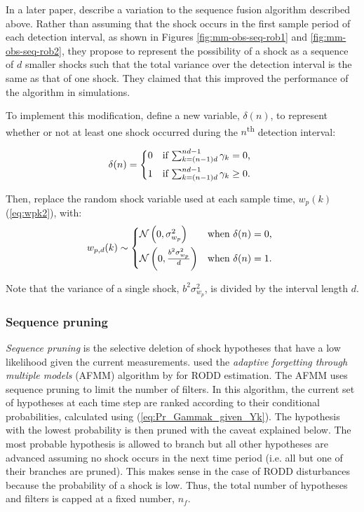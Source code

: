 In a later paper, \cite{robertson_method_1998} describe a variation to the sequence fusion algorithm described above.  Rather than assuming that the shock occurs in the first sample period of each detection interval, as shown in Figures \ref{fig:mm-obs-seq-rob1} and \ref{fig:mm-obs-seq-rob2}, they propose to represent the possibility of a shock as a sequence of $d$ smaller shocks such that the total variance over the detection interval is the same as that of one shock. They claimed that this improved the performance of the algorithm in simulations.

To implement this modification, define a new variable, $\delta(n)$, to represent whether or not at least one shock occurred during the $n$\textsuperscript{th} detection interval:

\begin{equation} \label{eq:deltak}
	\delta(n) = \begin{cases*}
		0 & \text{if} $\sum_{k=(n-1) d}^{n d-1} \gamma_{k}=0$, \\
		1 & \text{if} $\sum_{k=(n-1) d}^{n d-1} \gamma_{k}\ge0$.
	\end{cases*}
\end{equation}

Then, replace the random shock variable used at each sample time, $w_p(k)$ (\ref{eq:wpk2}), with:
\begin{equation} \label{eq:wpdk}
	w_{p,d}(k) \sim 
	\begin{cases*}
		\mathcal{N}\left(0, \sigma_{w_p}^2\right) & \text{when} $\delta(n) = 0$, \\
		\mathcal{N}\left(0, \frac{b^2\sigma_{w_p}^2}{d}\right) & \text{when} $\delta(n) = 1$.
	\end{cases*}
\end{equation}

Note that the variance of a single shock, $b^2\sigma_{w_p}^2$, is divided by the interval length $d$.

\subsubsection{Sequence pruning} \label{subsec-pruning}

\textit{Sequence pruning} is the selective deletion of shock hypotheses that have a low likelihood given the current measurements. \cite{eriksson_classification_1996} used the \textit{adaptive forgetting through multiple models} (AFMM) algorithm by \cite{andersson_adaptive_1985} for RODD estimation. The AFMM uses sequence pruning to limit the number of filters. In this algorithm, the current set of hypotheses at each time step are ranked according to their conditional probabilities, calculated using (\ref{eq:Pr_Gammak_given_Yk}). The hypothesis with the lowest probability is then pruned with the caveat explained below. The most probable hypothesis is allowed to branch but all other hypotheses are advanced assuming no shock occurs in the next time period (i.e. all but one of their branches are pruned). This makes sense in the case of RODD disturbances because the probability of a shock is low. Thus, the total number of hypotheses and filters is capped at a fixed number, $n_f$.

